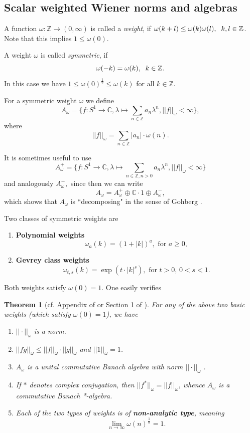 \documentclass[a4paper,11pt]{amsart}
\newtheorem{theorem}{Theorem}[section]
\theoremstyle{definition}
\numberwithin{equation}{section}
\newcommand{\C}{\mathbb{C}}
\begin{document}
\subsection {Scalar weighted Wiener norms and algebras}\label{sec:6.7}

\vspace{3mm}

A function $\omega : \mathbb{Z} \rightarrow (0,\infty)$ is called a \emph{weight}, if 
$\omega (k + l) \leq \omega (k) \omega(l), \hspace{2mm} k,l \in \mathbb{Z}$.
Note that this implies $1 \leq \omega(0)$.

A weight $\omega$ is called \emph{symmetric}, if 
$$ \omega(-k) = \omega (k), \hspace{2mm} k \in \mathbb{Z}.$$
In this case we have $1 \leq \omega(0)^\frac{1}{2} \leq \omega (k)$ for all $k \in \mathbb{Z}$.

For a symmetric weight $\omega$ we define
$$ A_\omega = \{f: S^1 \rightarrow \C, \lambda \mapsto \sum_{ n \in \mathbb{Z}} a_n \lambda^n, ||f||_\omega < \infty\},$$
where 
$$||f||_\omega = \sum_{n \in \mathbb{Z}} |a_n| \cdot \omega (n).$$

It is sometimes useful to use
$$ A_\omega^+ = \{f: S^1 \rightarrow \C, \lambda \mapsto \sum_{ n \in \mathbb{Z}, n > 0} a_n \lambda^n,
 ||f||_\omega < \infty \}$$
 and analogously $A_\omega^-,$ since then we can write 
 $$ A_\omega = A_\omega^+ \oplus \mathbb{C}\cdot 1 \oplus  A_\omega^-,$$
 which shows that $A_\omega$ is ``decomposing" in the sense of 
 Gohberg \cite{Gohberg}.

Two classes of symmetric weights are

\begin{enumerate}
\item {\bf Polynomial weights}
$$ \omega_a (k) = (1+  |k| )^a, \text{ for } a \geq 0,$$
\item {\bf Gevrey class weights} 
$$ \omega_{t,s}(k) = \exp(t \cdot |k|^s), \text{ for }   t > 0,\,  0 < s < 1.$$
\end{enumerate}

Both weights satisfy $\omega (0) = 1.$
One easily verifies
\begin{theorem}[cf. Appendix of \cite{GoWa} or Section 1 of \cite{DGS}] \label{Thm:norm-vector} 
For any of the above two  basic weights   (which satisfy $\omega(0) = 1$),  we have  
\begin{enumerate}
\item $|| \cdot ||_\omega$  is a norm.
\item $||fg||_\omega \leq ||f||_\omega \cdot ||g||_\omega$ and $||1||_\omega  = 1$.
\item $A_\omega$ is a unital commutative Banach algebra with norm $|| \cdot ||_\omega$ . 
\item If $*$ denotes complex conjugation, then $||f^*||_\omega  = ||f||_\omega $, whence 
$A_\omega$ is a commutative Banach *-algebra.
\item Each of the two types of weights is of {\bf non-analytic type}, meaning
$$ \lim_{n \rightarrow \infty} \omega(n)^{\frac{1}{n}}= 1.$$
\end{enumerate}
\end{theorem}
\end{document}
